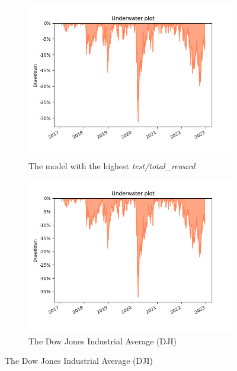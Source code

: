 \documentclass[../xlapes02]{subfiles}
\begin{document}
    \begin{figure}[H]
        \begin{subfigure}[t]{\experimentimgwidth\textwidth}
            \centering
            \includegraphics[width=\linewidth]{image/figure/drawdown_underwater_max}
            \caption{The model with the highest \emph{test/total\_reward}
            \label{fig:drawdown_underwater_max}}
        \end{subfigure}
        \hfill
        \begin{subfigure}[t]{\experimentimgwidth\textwidth}
            \centering
            \includegraphics[width=\linewidth]{image/figure/drawdown_underwater_dji}
            \caption{The Dow Jones Industrial Average (DJI)}
            \label{fig:drawdown_underwater_dji}
        \end{subfigure}


\end{figure}
\end{document}
